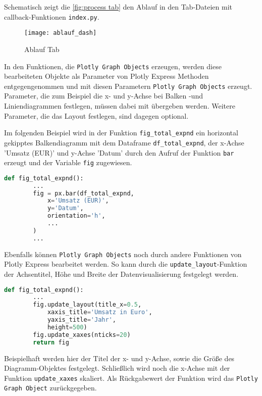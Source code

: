     Schematisch zeigt die \autoref{fig:process tab} den Ablauf in den Tab-Dateien mit callback-Funktionen \texttt{index.py}.
    
    \begin{figure}[H]
        \centering
            \texttt{[image: ablauf\_dash]}
            \caption{Ablauf Tab}
            \label{fig:process tab}
    \end{figure}

    In den Funktionen, die \texttt{Plotly Graph Objects} erzeugen, werden diese bearbeiteten Objekte als Parameter von Plotly Express Methoden entgegengenommen 
    und mit diesen Parametern \texttt{Plotly Graph Objects} erzeugt. Parameter, die zum Beispiel die x- und y-Achse bei Balken -und Liniendiagrammen
    festlegen, müssen dabei mit übergeben werden. Weitere Parameter, die das Layout festlegen, sind dagegen optional.
    
    Im folgenden Beispiel wird in der Funktion \texttt{fig\_total\_expnd} ein horizontal gekipptes Balkendiagramm mit dem Dataframe \texttt{df\_total\_expnd}, 
    der x-Achse 'Umsatz (EUR)' und y-Achse 'Datum' durch den Aufruf der Funktion \texttt{bar} erzeugt und der Variable \texttt{fig} zugewiesen. 

    \begin{lstlisting}[language=Python, caption=Funktion fig\_total\_expnd() Auszug 1]
    def fig_total_expnd():
        ...
        fig = px.bar(df_total_expnd,
            x='Umsatz (EUR)',
            y='Datum',
            orientation='h',
            ...
        )
        ...
    \end{lstlisting}
    
    Ebenfalls können \texttt{Plotly Graph Objects} noch durch andere Funktionen von Plotly Express bearbeitet werden. 
    So kann durch die \texttt{update\_layout}-Funktion der Achsentitel, Höhe und Breite der Datenvisualisierung festgelegt werden.

    \begin{lstlisting}[language=Python, caption=fig\_total\_expnd() Auszug 2]  
    def fig_total_expnd():
        ...
        fig.update_layout(title_x=0.5,
            xaxis_title='Umsatz in Euro',
            yaxis_title='Jahr',
            height=500)
        fig.update_xaxes(nticks=20)         
        return fig
    \end{lstlisting}

    Beispielhaft werden hier der Titel der x- und y-Achse, sowie die
    Größe des Diagramm-Objektes festgelegt. Schließlich wird noch die x-Achse mit der Funktion \texttt{update\_xaxes} skaliert.
    Als Rückgabewert der Funktion wird das \texttt{Plotly Graph Object} zurückgegeben.

